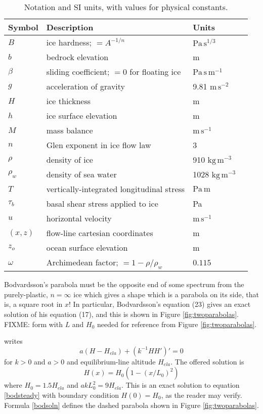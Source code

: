 \documentclass[twocolumn,letterpaper]{igs}
\begin{document}
\small
\begin{table}
\caption{Notation and SI units, with values for physical constants.}\label{tab:notation}

\medskip
\begin{tabular}{llll}
Symbol & Description & Units \\ \hline
$B$ & ice hardness; $=A^{-1/n}$ & $\text{Pa}\,\text{s}^{1/3}$  \\
$b$ & bedrock elevation & m \\
$\beta$ & sliding coefficient; $=0$ for floating ice & $\text{Pa}\,\text{s}\,\text{m}^{-1}$ \\
$g$ & acceleration of gravity  & 9.81 $\text{m}\,\text{s}^{-2}$\\
$H$ & ice thickness & m \\
$h$ & ice surface elevation & m \\
$M$ & mass balance & $\text{m}\,\text{s}^{-1}$ \\
$n$ & Glen exponent in ice flow law & 3 \\
$\rho$ & density of ice & 910 $\text{kg}\,\text{m}^{-3}$ \\
$\rho_w$ & density of sea water & 1028 $\text{kg}\,\text{m}^{-3}$ \\
$T$ & vertically-integrated longitudinal stress & $\text{Pa}\,\text{m}$ \\
$\tau_{b}$ & basal shear stress applied to ice & Pa \\
$u$ & horizontal velocity & $\text{m}\,\text{s}^{-1}$ \\
$(x,z)$ & flow-line cartesian coordinates & m  \\
$z_o$ & ocean surface elevation & m \\
$\omega$ & Archimedean factor; $=1 - \rho/\rho_w$ & $0.115$
\end{tabular}
\end{table}

Bodvardsson's parabola must be the opposite end of some spectrum from the
purely-plastic, $n=\infty$ ice which gives a shape which is a parabola
on its side, that is, a square root in $x$!  In particular, Bodvardsson's equation (23) gives an exact solution of his equation (17), and this is shown in Figure \ref{fig:twoparabolas}.  FIXME: form with $L$ and $H_0$ needed for reference from Figure \ref{fig:twoparabolas}.

\citet[equation (17)]{Bodvardsson} writes 
\begin{equation}
a (H - H_{ela}) + (k^{-1} H H')' = 0  \label{bodsteady}
\end{equation}
for $k>0$ and $a>0$ and equilibrium-line altitude $H_{ela}$.  The offered solution \citep[equation (23)]{Bodvardsson} is
\begin{equation}
H(x) = H_0 (1 - (x/L_0)^2)  \label{bodsoln}
\end{equation}
where $H_0 = 1.5 H_{ela}$ and $a k L_0^2 = 9 H_{ela}$.  This is an exact solution to equation \eqref{bodsteady} with boundary condition $H(0)=H_0$, as the reader may verify.  Formula \eqref{bodsoln} defines the dashed parabola shown in Figure \ref{fig:twoparabolas}.
\end{document}
